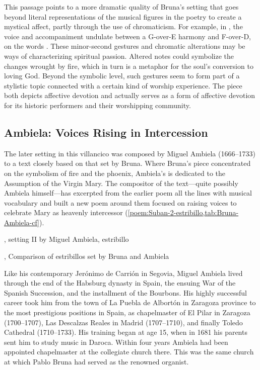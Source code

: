 This passage points to a more dramatic quality of Bruna's setting that goes
beyond literal representations of the musical figures in the poetry to create a
mystical affect, partly through the use of chromaticism.
For example, in , the voice and accompaniment undulate between a
G-over-E\fl{} harmony and F\sh-over-D, on the words .
These minor-second gestures and chromatic alterations may be
ways of characterizing spiritual passion.
Altered notes could symbolize the changes wrought by fire, which in turn is a
metaphor for the soul's conversion to loving God.  
Beyond the symbolic level, such gestures seem to form part of a stylistic topic
connected with a certain kind of worship experience.  
The piece both depicts affective devotion and actually serves as a form of
affective devotion for its historic performers and their worshipping community.


\subsection{Ambiela: Voices Rising in Intercession}

The later setting in this villancico was composed by Miguel Ambiela
(1666--1733) to a text closely based on that set by Bruna.
Where Bruna's piece concentrated on the symbolism of fire and the phoenix,
Ambiela's is dedicated to the Assumption of the Virgin Mary.
The compositor of the text---quite possibly Ambiela himself---has excerpted
from the earlier poem all the lines with musical vocabulary and built a new
poem around them focused on raising voices to celebrate Mary as heavenly
intercessor (\cref{poem:Suban-2-estribillo,tab:Bruna-Ambiela-cf}).

{, setting II by Miguel Ambiela, estribillo}

{, Comparison of estribillos set by Bruna and Ambiela}

Like his contemporary Jerónimo de Carrión in Segovia, Miguel Ambiela lived
through the end of the Habsburg dynasty in Spain, the ensuing War of the
Spanish Succession, and the installment of the Bourbons.
His highly successful career took him from the town of La Puebla de Albortón in
Zaragoza province to the most prestigious positions in Spain, as chapelmaster
of El Pilar in Zaragoza (1700--1707), Las Descalzas Reales in Madrid
(1707--1710), and finally Toledo Cathedral (1710--1733).%
    \Autocites
    [1]{Calahorra:Suban}
    []{Grove}
    {Alvarez:Ambiela}
His training began at age 15, when in 1681 his parents sent him to study music
in Daroca.
Within four years Ambiela had been appointed chapelmaster at the collegiate
church there.
This was the same church at which Pablo Bruna had served as the renowned
organist.

